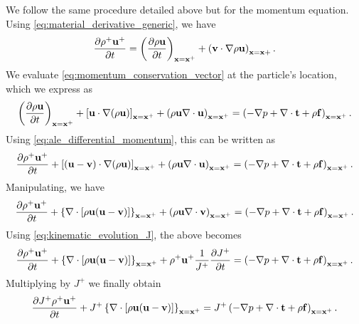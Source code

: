 \documentclass[oneside,a4paper,11pt]{report}
\begin{document}
We follow the same procedure detailed above but for the momentum equation. Using \cref{eq:material_derivative_generic}, we have
\begin{equation}
\label{eq:ale_differential_momentum}
    \frac{\partial \rho^+ \mathbf{u}^+}{\partial t} = \left ( \frac{\partial \rho \mathbf{u}}{\partial t} \right )_{\mathbf{x} = \mathbf{x}^+} + \left(\mathbf{v} \cdot \nabla \rho \mathbf{u} \right)_{\mathbf{x} = \mathbf{x} +}.
\end{equation}
We evaluate \cref{eq:momentum_conservation_vector} at the particle's location, which we express as
\begin{equation*}
\left ( \frac{\partial \rho\mathbf{u} }{\partial t} \right )_{\mathbf{x} = \mathbf{x}^+} + \left [ \mathbf{u} \cdot \nabla (\rho\mathbf{u} ) \right]_{\mathbf{x} = \mathbf{x}^+} + \left ( \rho \mathbf{u} \nabla \cdot \mathbf{u} \right)_{\mathbf{x} = \mathbf{x}^+} = \left ( -\nabla p + \nabla\cdot \mathbf{t} +\rho \mathbf{f} \right)_{\mathbf{x} = \mathbf{x}^+}.
\end{equation*}
Using \cref{eq:ale_differential_momentum}, this can be written as
\begin{equation*}
\frac{\partial \rho^+ \mathbf{u}^+}{\partial t} + \left [ (\mathbf{u} - \mathbf{v}) \cdot \nabla (\rho\mathbf{u} ) \right]_{\mathbf{x} = \mathbf{x}^+} + \left ( \rho \mathbf{u} \nabla \cdot \mathbf{u} \right)_{\mathbf{x} = \mathbf{x}^+} = \left ( -\nabla p + \nabla\cdot \mathbf{t} +\rho \mathbf{f} \right)_{\mathbf{x} = \mathbf{x}^+}.
\end{equation*}
Manipulating, we have
\begin{equation*}
\frac{\partial \rho^+ \mathbf{u}^+}{\partial t} + \left \{ \nabla \cdot [\rho \mathbf{u} (\mathbf{u} - \mathbf{v}) ] \right \}_{\mathbf{x} = \mathbf{x}^+} + \left ( \rho \mathbf{u} \nabla \cdot \mathbf{v} \right)_{\mathbf{x} = \mathbf{x}^+} = \left ( -\nabla p + \nabla\cdot \mathbf{t} +\rho \mathbf{f} \right)_{\mathbf{x} = \mathbf{x}^+}.
\end{equation*}
Using \cref{eq:kinematic_evolution_J}, the above becomes
\begin{equation*}
\frac{\partial \rho^+ \mathbf{u}^+}{\partial t} + \left \{ \nabla \cdot [\rho \mathbf{u} (\mathbf{u} - \mathbf{v}) ] \right \}_{\mathbf{x} = \mathbf{x}^+} + \rho^+ \mathbf{u}^+ \frac{1}{J^+} \frac{\partial J^+}{\partial t} = \left ( -\nabla p + \nabla\cdot \mathbf{t} +\rho \mathbf{f} \right)_{\mathbf{x} = \mathbf{x}^+}.
\end{equation*}
Multiplying by $J^+$ we finally obtain 
\begin{equation}
    \label{eq:ale_differential_momentum_conservation}
\frac{\partial J^+ \rho^+ \mathbf{u}^+}{\partial t} + J^+ \left \{ \nabla \cdot [\rho \mathbf{u} (\mathbf{u} - \mathbf{v}) ] \right \}_{\mathbf{x} = \mathbf{x}^+} = J^+ \left ( -\nabla p + \nabla\cdot \mathbf{t} +\rho \mathbf{f} \right)_{\mathbf{x} = \mathbf{x}^+}.
\end{equation}
\end{document}
